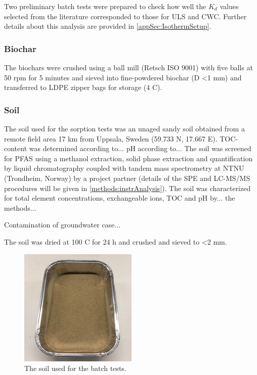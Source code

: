 Two preliminary batch tests were prepared to check how well the $K_d$ values selected from the literature corresponded to those for ULS and CWC. Further details about this analysis are provided in \cref{appSec:IsothermSetup}.

\subsubsection{Biochar}
The biochars were crushed using a ball mill (Retsch ISO 9001) with five balls at 50 rpm for 5 minutes and sieved into fine-powdered biochar (D \textless 1 mm) and transferred to LDPE zipper bags for storage (4 \textdegree C). 

\subsubsection{Soil}
The soil used for the sorption tests was an unaged sandy soil obtained from a remote field area 17 km from Uppsala, Sweden (59.733 N, 17.667 E). TOC-content was determined according to... pH according to... The soil was screened for PFAS using a methanol extraction, solid phase extraction and quantification by liquid chromatography coupled with tandem mass spectrometry at NTNU (Trondheim, Norway) by a project partner (details of the SPE and LC-MS/MS procedures will be given in \cref{methods:instrAnalysis}). The soil was characterized for total element concentrations, exchangeable ions, TOC and pH by... the methods... 

Contamination of groundwater case...

The soil was dried at 100 \textdegree C for 24 h and crushed and sieved to \textless 2 mm. 

\begin{figure}
    \centering
    \includegraphics[width=0.5\textwidth]{Bilder/Samples/Soil_blank.JPG}
    \caption{The soil used for the batch tests.}
    \label{fig:soil}
\end{figure}

